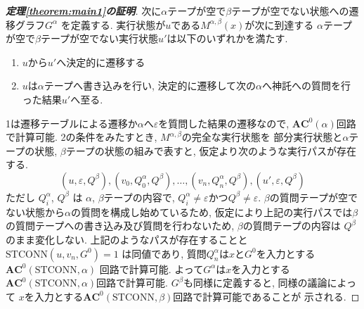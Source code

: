 \documentclass[10pt,a4paper,twocolumn]{jarticle}
\theoremstyle{definition}
\theoremstyle{remark}
\newcommand{\classfont}{\mathbf}
\newcommand{\AC}{\classfont{AC}}
\newcommand{\probfont}{\text}
\newcommand{\STCONN}{\probfont{STCONN}}
\begin{document}
\begin{proof}[\bf 定理\ref{theorem:main1}の証明]
次に$\alpha$テープが空で$\beta$テープが空でない状態への遷移グラフ$G^\alpha$
を定義する.
実行状態が$u$である$M^{\alpha, \beta}(x)$が次に到達する
$\alpha$テープが空で$\beta$テープが空でない実行状態$u'$は以下のいずれかを満たす.
\begin{enumerate}
 \item $u$から$u'$へ決定的に遷移する
 \item $u$は$\alpha$テープへ書き込みを行い,
       決定的に遷移して次の$\alpha$へ神託への質問を行った結果$u'$へ至る.
\end{enumerate}
1は遷移テーブルによる遷移か$\alpha$へ$\varepsilon$を質問した結果の遷移なので,
$\AC^0(\alpha)$回路で計算可能.
2の条件をみたすとき, $M^{\alpha, \beta}$の完全な実行状態を
部分実行状態と$\alpha$テープの状態, $\beta$テープの状態の組みで表すと,
仮定より次のような実行パスが存在する.
\begin{equation*}
 (u, \varepsilon, Q^\beta), (v_0, Q^\alpha_0, Q^\beta), \dots, 
  (v_n, Q^\alpha_n, Q^\beta), (u', \varepsilon, Q^\beta)
\end{equation*}
ただし $Q^\alpha_i$, $Q^\beta$ は $\alpha$, $\beta$テープの内容で,
$Q^\alpha_i \not = \varepsilon$かつ$Q^\beta \not = \varepsilon$.
$\beta$の質問テープが空でない状態から$\alpha$の質問を構成し始めているため,
仮定により上記の実行パスでは$\beta$の質問テープへの書き込み及び質問を行わないため, $\beta$の質問テープの内容は $Q^\beta$ のまま変化しない.
上記のようなパスが存在することと$\STCONN(u, v_n, G^0) = 1$ は同値であり,
質問$Q^\alpha_n$は$x$と$G^0$を入力とする$\AC^0(\STCONN, \alpha)$
回路で計算可能.
よって$G^\alpha$は$x$を入力とする$\AC^0(\STCONN, \alpha)$回路で計算可能.
$G^\beta$も同様に定義すると, 同様の議論によって
$x$を入力とする$\AC^0(\STCONN, \beta)$回路で計算可能であることが
示される.


\end{proof}
\end{document}
